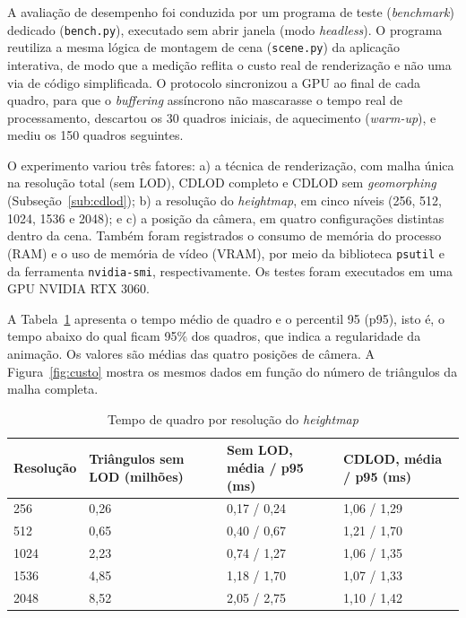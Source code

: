 \documentclass[conference]{IEEEtran}
\newcommand{\fonte}[1]{\par\vspace{2pt}{\footnotesize Fonte: #1\par}}
\begin{document}
A avaliação de desempenho foi conduzida por um programa de teste
(\emph{benchmark}) dedicado (\texttt{bench.py}), executado sem abrir janela
(modo \emph{headless}). O programa reutiliza a mesma lógica de montagem de
cena (\texttt{scene.py}) da aplicação interativa, de modo que a medição
reflita o custo real de renderização e não uma via de código simplificada.
O protocolo sincronizou a GPU ao final de cada quadro, para que o
\emph{buffering} assíncrono não mascarasse o tempo real de processamento,
descartou os 30 quadros iniciais, de aquecimento (\emph{warm-up}), e mediu
os 150 quadros seguintes.

O experimento variou três fatores: a) a técnica de renderização, com malha
única na resolução total (sem LOD), CDLOD completo e CDLOD sem
\emph{geomorphing} (Subseção~\ref{sub:cdlod}); b) a resolução do
\emph{heightmap}, em cinco níveis (256, 512, 1024, 1536 e 2048); e c) a
posição da câmera, em quatro configurações distintas dentro da cena. Também
foram registrados o consumo de memória do processo (RAM) e o uso de memória
de vídeo (VRAM), por meio da biblioteca \texttt{psutil} e da ferramenta
\texttt{nvidia-smi}, respectivamente. Os testes foram executados em uma
GPU NVIDIA RTX 3060.

A Tabela~\ref{tab:tempos} apresenta o tempo médio de quadro e o percentil
95 (p95), isto é, o tempo abaixo do qual ficam 95\% dos quadros, que indica
a regularidade da animação. Os valores são médias das quatro posições de
câmera. A Figura~\ref{fig:custo} mostra os mesmos dados em função do número
de triângulos da malha completa.

\begin{table}[t]
\caption{Tempo de quadro por resolução do \emph{heightmap}}
\label{tab:tempos}
\centering
\begin{tabular}{@{}p{1.5cm}p{1.7cm}p{2.0cm}p{2.0cm}@{}}
\toprule
\textbf{Resolução} & \textbf{Triângulos sem LOD (milhões)} & \textbf{Sem LOD, média / p95 (ms)} & \textbf{CDLOD, média / p95 (ms)} \\
\midrule
256  & 0,26 & 0,17 / 0,24 & 1,06 / 1,29 \\
512  & 0,65 & 0,40 / 0,67 & 1,21 / 1,70 \\
1024 & 2,23 & 0,74 / 1,27 & 1,06 / 1,35 \\
1536 & 4,85 & 1,18 / 1,70 & 1,07 / 1,33 \\
2048 & 8,52 & 2,05 / 2,75 & 1,10 / 1,42 \\
\bottomrule
\end{tabular}
\fonte{Elaborado pelos autores (2026), com dados do teste de desempenho. Os
triângulos incluem a água. O CDLOD desenha cerca de 0,43 milhão de
triângulos por quadro em todas as resoluções.}
\end{table}
\end{document}
